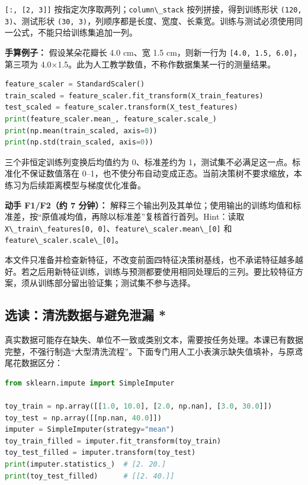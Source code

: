 \documentclass[UTF8,a4paper,11pt,fontset=fandol]{ctexart}
\providecommand{\passthrough}[1]{#1}
\begin{document}
\passthrough{\lstinline![:, [2, 3]]!} 按指定次序取两列；\passthrough{\lstinline!column\_stack!} 按列拼接，得到训练形状 \passthrough{\lstinline!(120, 3)!}、测试形状 \passthrough{\lstinline!(30, 3)!}，列顺序都是长度、宽度、长乘宽。训练与测试必须使用同一公式，不能只给训练集追加一列。

\textbf{手算例子：} 假设某朵花瓣长 4.0 cm、宽 1.5 cm，则新一行为 \passthrough{\lstinline![4.0, 1.5, 6.0]!}，第三项为 4.0×1.5。此为人工教学数值，不称作数据集某一行的测量结果。

\begin{lstlisting}[language=Python]
feature_scaler = StandardScaler()
train_scaled = feature_scaler.fit_transform(X_train_features)
test_scaled = feature_scaler.transform(X_test_features)
print(feature_scaler.mean_, feature_scaler.scale_)
print(np.mean(train_scaled, axis=0))
print(np.std(train_scaled, axis=0))
\end{lstlisting}

三个非恒定训练列变换后均值约为 0、标准差约为 1，测试集不必满足这一点。标准化不保证数值落在 0--1，也不使分布自动变成正态。当前决策树不要求缩放，本练习为后续距离模型与梯度优化准备。

\textbf{动手 F1/F2（约 7 分钟）：} 解释三个输出列及其单位；使用输出的训练均值和标准差，按``原值减均值，再除以标准差''复核首行首列。Hint：读取 \passthrough{\lstinline!X\_train\_features[0, 0]!}、\passthrough{\lstinline!feature\_scaler.mean\_[0]!} 和 \passthrough{\lstinline!feature\_scaler.scale\_[0]!}。

本文件只准备并检查新特征，不改变前面四特征决策树基线，也不承诺特征越多越好。若之后用新特征训练，训练与预测都要使用相同处理后的三列。要比较特征方案，须从训练部分留出验证集；测试集不参与选择。

\clearpage

\subsection{选读：清洗数据与避免泄漏 *}\label{ux9009ux8bfbux6e05ux6d17ux6570ux636eux4e0eux907fux514dux6cc4ux6f0f}

真实数据可能存在缺失、单位不一致或类别文本，需要按任务处理。本课已有数据完整，不强行制造``大型清洗流程''。下面专门用人工小表演示缺失值填补，与原鸢尾花数据区分：

\begin{lstlisting}[language=Python]
from sklearn.impute import SimpleImputer

toy_train = np.array([[1.0, 10.0], [2.0, np.nan], [3.0, 30.0]])
toy_test = np.array([[np.nan, 40.0]])
imputer = SimpleImputer(strategy="mean")
toy_train_filled = imputer.fit_transform(toy_train)
toy_test_filled = imputer.transform(toy_test)
print(imputer.statistics_)  # [2. 20.]
print(toy_test_filled)      # [[2. 40.]]
\end{lstlisting}
\end{document}
